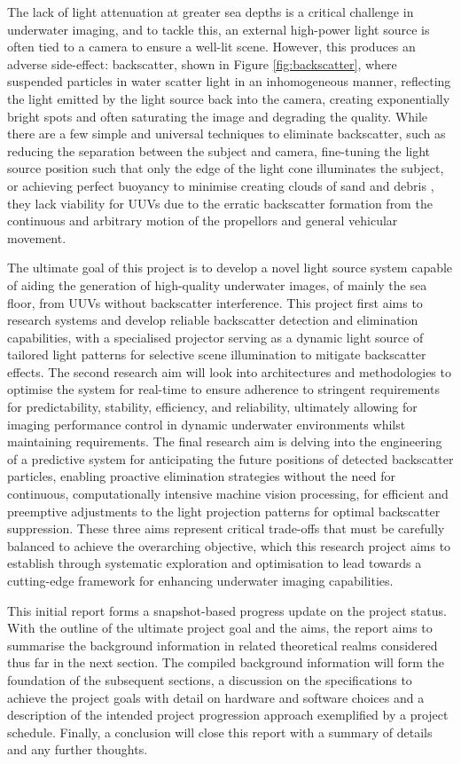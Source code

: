 The lack of light attenuation at greater sea depths is a critical challenge in underwater imaging, and to tackle this, an external high-power light source is often tied to a camera to ensure a well-lit scene. However, this produces an adverse side-effect: backscatter, shown in Figure \ref{fig:backscatter}, where suspended particles in water scatter light in an inhomogeneous manner, reflecting the light emitted by the light source back into the camera, creating exponentially bright spots and often saturating the image and degrading the quality. While there are a few simple and universal techniques to eliminate backscatter, such as reducing the separation between the subject and camera, fine-tuning the light source position such that only the edge of the light cone illuminates the subject, or achieving perfect buoyancy to minimise creating clouds of sand and debris \cite{brentdurandEasyWaysEliminate2013}, they lack viability for UUVs due to the erratic backscatter formation from the continuous and arbitrary motion of the propellors and general vehicular movement.

The ultimate goal of this project is to develop a novel light source system capable of aiding the generation of high-quality underwater images, of mainly the sea floor, from UUVs without backscatter interference. This project first aims to research systems and develop reliable backscatter detection and elimination capabilities, with a specialised projector serving as a dynamic light source of tailored light patterns for selective scene illumination to mitigate backscatter effects. The second research aim will look into architectures and methodologies to optimise the system for real-time to ensure adherence to stringent requirements for predictability, stability, efficiency, and reliability, ultimately allowing for imaging performance control in dynamic underwater environments whilst maintaining requirements. The final research aim is delving into the engineering of a predictive system for anticipating the future positions of detected backscatter particles, enabling proactive elimination strategies without the need for continuous, computationally intensive machine vision processing, for efficient and preemptive adjustments to the light projection patterns for optimal backscatter suppression. These three aims represent critical trade-offs that must be carefully balanced to achieve the overarching objective, which this research project aims to establish through systematic exploration and optimisation to lead towards a cutting-edge framework for enhancing underwater imaging capabilities.

This initial report forms a snapshot-based progress update on the project status. With the outline of the ultimate project goal and the aims, the report aims to summarise the background information in related theoretical realms considered thus far in the next section. The compiled background information will form the foundation of the subsequent sections, a discussion on the specifications to achieve the project goals with detail on hardware and software choices and a description of the intended project progression approach exemplified by a project schedule. Finally, a conclusion will close this report with a summary of details and any further thoughts.
